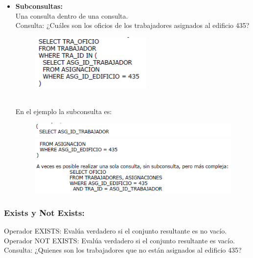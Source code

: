 \documentclass[preprint,12pt]{elsarticle}
\begin{document}
\begin{itemize}
\item \textbf{Subconsultas:} \\ Una consulta dentro de una consulta.\\
Consulta: ¿Cuáles son los oficios de los trabajadores asignados al edificio 435?
	\begin{figure}[htb]
		\begin{center}
			\includegraphics[width=6cm]{./IMAGENES/subconsulta1}
		\end{center}
	\end{figure}
\\ En el ejemplo la subconsulta es:
	\begin{figure}[htb]
		\begin{center}
			\includegraphics[width=11.5cm]{./IMAGENES/subconsulta2}
			\includegraphics[width=11.5cm]{./IMAGENES/subconsulta3}
		\end{center}
	\end{figure}

\end{itemize}

\subsubsection{\textbf{Exists y Not Exists:}}
Operador EXISTS: Evalúa verdadero si el conjunto resultante es no vacío. \\ Operador NOT EXISTS: Evalúa verdadero si el conjunto resultante es vacío. \\ 
Consulta: ¿Quienes son los trabajadores que no están asignados al edificio 435?
\end{document}
